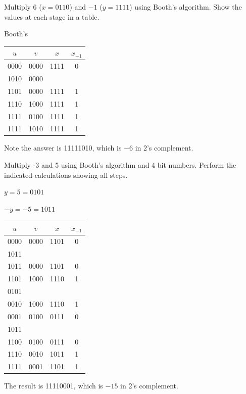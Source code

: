 \begin{example}
Multiply $6$ ($x=0110$) and $-1$ ($y=1111$) using Booth's algorithm.  Show the values at each stage in a table.

       {\color{ans}
       Booth's

       \begin{tabular}{cccc}
         $u$ & $v$ & $x$ & $x_{-1}$ \\ \hline
         0000 & 0000 & 1111 & 0 \\ \hline
         1010 & 0000 &   &   \\
         1101 & 0000 & 1111 & 1 \\ \hline
         1110 & 1000 & 1111 & 1 \\ \hline
         1111 & 0100 & 1111 & 1 \\ \hline
         1111 & 1010 & 1111 & 1 \\
       \end{tabular}

       Note the answer is 11111010, which is $-6$ in 2's complement.
       }
\end{example}

\begin{example}
Multiply -3 and 5 using Booth's algorithm and 4 bit numbers.  Perform the indicated calculations showing all steps.

    {\color{ans}
    $y=5=0101$

    $-y=-5=1011$

    \begin{tabular}{|c|c|cc|} \hline
      $u$  & $v$  & $x$  & $x_{-1}$ \\ \hline
      0000 & 0000 & 1101 & 0 \\ \hline
      1011 &      &      &   \\ \cline{1-1}
      1011 & 0000 & 1101 & 0 \\
      1101 & 1000 & 1110 & 1 \\ \hline
      0101 &      &      &   \\ \cline{1-1}
      0010 & 1000 & 1110 & 1 \\
      0001 & 0100 & 0111 & 0 \\ \hline
      1011 &      &      &   \\ \cline{1-1}
      1100 & 0100 & 0111 & 0 \\
      1110 & 0010 & 1011 & 1 \\ \hline
      1111 & 0001 & 1101 & 1 \\ \hline
    \end{tabular}

    The result is 11110001, which is $-15$ in 2's complement.
    }
\end{example}

